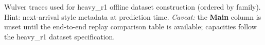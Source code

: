 \begin{table}[t]
\centering
\caption{Wulver traces used for heavy\_r1 offline dataset construction (ordered by family). Hint: next-arrival style metadata at prediction time. \textit{Caveat:} the \textbf{Main} column is unset until the end-to-end replay comparison table is available; capacities follow the heavy\_r1 dataset specification.}
\label{tab:dataset-summary}

\end{table}
